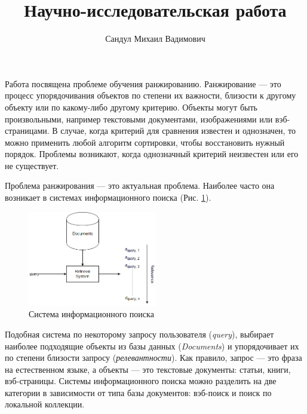 \documentclass[specialist,
               substylefile = spbu.rtx,
               subf,href,colorlinks=true, 12pt]{disser}
\newcommand{\figref}[1]{(Рис. \ref{#1})}
\renewcommand{\it}[1]{{\textit{#1}}}
\begin{document}

\title{
Научно-исследовательская работа}


\author{ Сандул Михаил Вадимович }


\date{\number\year}

\maketitle

\intro

Работа посвящена проблеме обучения ранжированию. Ранжирование --- это процесс упорядочивания объектов по степени их важности, близости к другому объекту или по какому-либо другому критерию. Объекты могут быть произвольными, например текстовыми документами, изображениями или вэб-страницами. В случае, когда критерий для сравнения известен и однозначен, то можно применить любой алгоритм сортировки, чтобы восстановить нужный порядок. Проблемы возникают, когда однозначный критерий неизвестен или его не существует.\par  

Проблема ранжирования --- это актуальная проблема. Наиболее часто она возникает в системах информационного поиска \figref{fig:IRSystem}.\par
\begin{figure}[h]
\centering
\includegraphics[width=0.5\textwidth]{IRSystem.png}
\caption{Система информационного поиска}
\label{fig:IRSystem}
\end{figure}

Подобная система по некоторому запросу пользователя (\it{query}), выбирает наиболее подходящие объекты из базы данных (\it{Documents}) и упорядочивает их по степени близости запросу (\it{релевантности}). Как правило, запрос --- это фраза на естественном языке, а объекты --- это текстовые документы: статьи, книги, вэб-страницы. Системы информационного поиска можно разделить на две категории в зависимости от типа базы документов: вэб-поиск и поиск по локальной коллекции.\par
\end{document}
